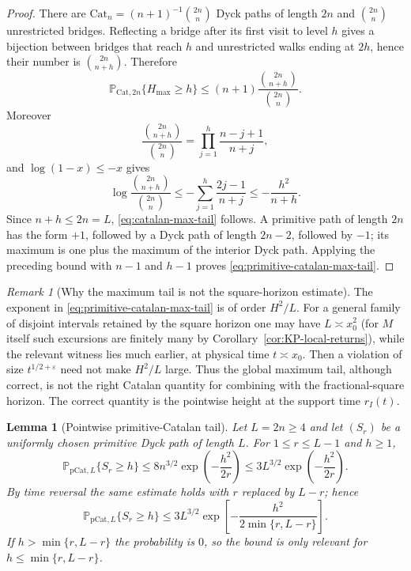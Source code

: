 \documentclass[11pt]{amsart}
\numberwithin{equation}{section}
\theoremstyle{plain}
\newtheorem{lemma}[theorem]{Lemma}
\theoremstyle{definition}
\theoremstyle{remark}
\newtheorem{remark}[theorem]{Remark}
\newcommand{\eps}{\varepsilon}
\begin{document}
\begin{proof}
There are $\mathrm{Cat}_n=(n+1)^{-1}\binom{2n}{n}$ Dyck paths of length $2n$ and
$\binom{2n}{n}$ unrestricted bridges.  Reflecting a bridge after its first
visit to level $h$ gives a bijection between bridges that reach $h$ and
unrestricted walks ending at $2h$, hence their number is
$\binom{2n}{n+h}$.  Therefore
\[
 \mathbb P_{\mathrm{Cat},2n}\{H_{\max}\ge h\}
 \le (n+1)\frac{\binom{2n}{n+h}}{\binom{2n}{n}}.
\]
Moreover
\[
 \frac{\binom{2n}{n+h}}{\binom{2n}{n}}
 =\prod_{j=1}^h\frac{n-j+1}{n+j},
\]
and $\log(1-x)\le-x$ gives
\[
 \log\frac{\binom{2n}{n+h}}{\binom{2n}{n}}
 \le-\sum_{j=1}^h\frac{2j-1}{n+j}
 \le-\frac{h^2}{n+h}.
\]
Since $n+h\le2n=L$, \eqref{eq:catalan-max-tail} follows.  A primitive path
of length $2n$ has the form $+1$, followed by a Dyck path of length $2n-2$,
followed by $-1$; its maximum is one plus the maximum of the interior Dyck
path.  Applying the preceding bound with $n-1$ and $h-1$ proves
\eqref{eq:primitive-catalan-max-tail}.
\end{proof}

\begin{remark}[Why the maximum tail is not the square-horizon estimate]
\label{rem:max-tail-square-limit}
The exponent in \eqref{eq:primitive-catalan-max-tail} is of order
$H^2/L$.  For a general family of disjoint intervals retained by the
square horizon one may have $L\asymp x_0^2$ (for $M$ itself such excursions
are finitely many by Corollary~\ref{cor:KP-local-returns}), while the relevant witness lies much earlier, at physical
time $t\asymp x_0$.  Then a violation of size $t^{1/2+\eps}$ need not make
$H^2/L$ large.  Thus the global maximum tail, although correct, is not the
right Catalan quantity for combining with the fractional-square horizon.
The correct quantity is the pointwise height at the support time
$r_I(t)$.
\end{remark}

\begin{lemma}[Pointwise primitive-Catalan tail]
\label{lem:pointwise-catalan-tail}
Let $L=2n\ge4$ and let $(S_r)$ be a uniformly chosen primitive Dyck path of
length $L$.  For $1\le r\le L-1$ and $h\ge1$,
\begin{equation}
\label{eq:pointwise-catalan-tail-left}
 \mathbb P_{\mathrm{pCat},L}\{S_r\ge h\}
 \le 8n^{3/2}\exp\!\left(-\frac{h^2}{2r}\right)
 \le 3L^{3/2}\exp\!\left(-\frac{h^2}{2r}\right).
\end{equation}
By time reversal the same estimate holds with $r$ replaced by $L-r$;
hence
\begin{equation}
\label{eq:pointwise-catalan-tail-two-sided}
 \mathbb P_{\mathrm{pCat},L}\{S_r\ge h\}
 \le 3L^{3/2}
 \exp\!\left[-\frac{h^2}{2\min\{r,L-r\}}\right].
\end{equation}
If $h>\min\{r,L-r\}$ the probability is $0$, so the bound is only
relevant for $h\le\min\{r,L-r\}$.
\end{lemma}
\end{document}
